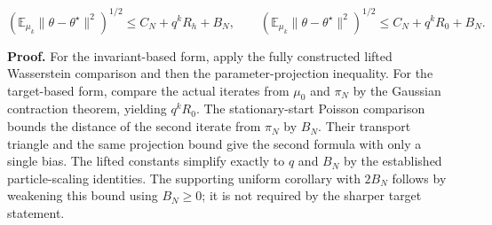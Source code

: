 \documentclass[11pt,a4paper]{article}
\begin{document}
\[\left(\mathbb E_{\mu_k}\|\theta-\theta^\star\|^2\right)^{1/2}\le C_N+q^kR_h+B_N,\qquad \left(\mathbb E_{\mu_k}\|\theta-\theta^\star\|^2\right)^{1/2}\le C_N+q^kR_0+B_N.\]


\textbf{Proof.} For the invariant-based form, apply the fully constructed lifted Wasserstein comparison and then the parameter-projection inequality. For the target-based form, compare the actual iterates from \(\mu_0\) and \(\pi_N\) by the Gaussian contraction theorem, yielding \(q^kR_0\). The stationary-start Poisson comparison bounds the distance of the second iterate from \(\pi_N\) by \(B_N\). Their transport triangle and the same projection bound give the second formula with only a single bias. The lifted constants simplify exactly to \(q\) and \(B_N\) by the established particle-scaling identities. The supporting uniform corollary with \(2B_N\) follows by weakening this bound using \(B_N\ge0\); it is not required by the sharper target statement.
\end{document}
